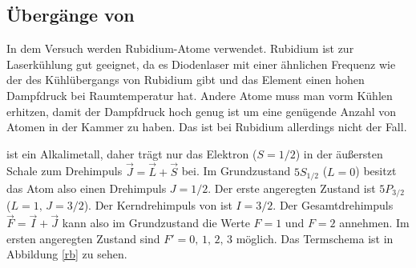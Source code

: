 \documentclass[12pt, a4paper]{article}
\begin{document}
  \subsection{Übergänge von }
  In dem Versuch werden Rubidium-Atome verwendet. Rubidium ist zur Laserkühlung gut geeignet, da es Diodenlaser mit einer ähnlichen Frequenz wie der des Kühlübergangs von Rubidium gibt und das Element einen hohen Dampfdruck bei Raumtemperatur hat. Andere Atome muss man vorm Kühlen erhitzen, damit der Dampfdruck hoch genug ist um eine genügende Anzahl von Atomen in der Kammer zu haben. Das ist bei Rubidium allerdings nicht der Fall.
  
 ist ein Alkalimetall, daher trägt nur das Elektron ($S=1/2$) in der äußersten Schale zum Drehimpuls $\vec{J}=\vec{L}+\vec{S}$ bei. Im Grundzustand $5S_{1/2}$ ($L=0$) besitzt das Atom also einen Drehimpuls $J = 1/2$. Der erste angeregten Zustand ist $5P_{3/2}$ ($L=1,\, J=3/2$). Der Kerndrehimpuls von  ist $I=3/2$. Der Gesamtdrehimpuls $\vec{F}=\vec{I}+\vec{J}$ kann also im Grundzustand die Werte $F = 1$ und $F = 2$ annehmen. Im ersten angeregten Zustand sind $F'= 0,\, 1,\, 2,\, 3$ möglich. Das Termschema ist in Abbildung \ref{rb} zu sehen.
\end{document}
